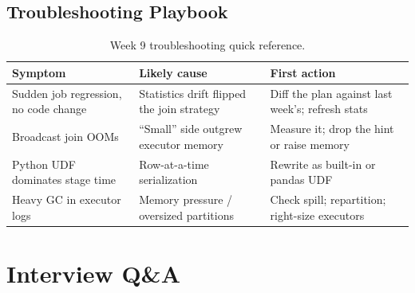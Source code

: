 \subsection{Troubleshooting Playbook}
\begin{table}[H]
\centering
\small
\begin{tabular}{@{}p{3.6cm}p{4.2cm}p{4.8cm}@{}}
\toprule
\textbf{Symptom} & \textbf{Likely cause} & \textbf{First action} \\
\midrule
Sudden job regression, no code change & Statistics drift flipped the join strategy & Diff the plan against last week's; refresh stats \\
Broadcast join OOMs & ``Small'' side outgrew executor memory & Measure it; drop the hint or raise memory \\
Python UDF dominates stage time & Row-at-a-time serialization & Rewrite as built-in or pandas UDF \\
Heavy GC in executor logs & Memory pressure / oversized partitions & Check spill; repartition; right-size executors \\
\bottomrule
\end{tabular}
\caption{Week 9 troubleshooting quick reference.}
\label{tab:ch9-trouble}
\end{table}

\section{Interview Q\&A}
